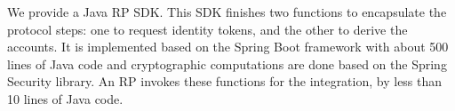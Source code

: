 


We provide a Java RP SDK.
This SDK finishes two functions to encapsulate the protocol steps:
 one to request identity tokens,
    and the other to derive the accounts. %
It is implemented based on the Spring Boot framework  with about 500 lines of Java code
 and cryptographic computations are done based on the Spring Security library.
An RP invokes these functions for the integration,
    by less than 10 lines of Java code.

